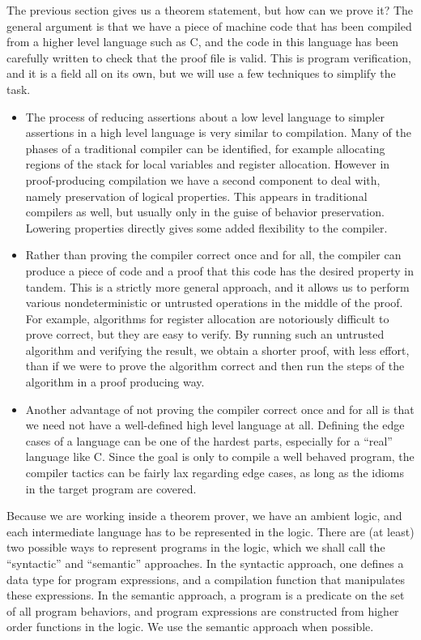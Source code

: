 \documentclass[runningheads]{llncs}
\begin{document}
The previous section gives us a theorem statement, but how can we prove it? The general argument is that we have a piece of machine code that has been compiled from a higher level language such as C, and the code in this language has been carefully written to check that the proof file is valid. This is program verification, and it is a field all on its own, but we will use a few techniques to simplify the task.
\begin{itemize}
  \item The process of reducing assertions about a low level language to simpler assertions in a high level language is very similar to compilation. Many of the phases of a traditional compiler can be identified, for example allocating regions of the stack for local variables and register allocation. However in proof-producing compilation we have a second component to deal with, namely preservation of logical properties. This appears in traditional compilers as well, but usually only in the guise of behavior preservation. Lowering properties directly gives some added flexibility to the compiler.
  \item Rather than proving the compiler correct once and for all, the compiler can produce a piece of code and a proof that this code has the desired property in tandem. This is a strictly more general approach, and it allows us to perform various nondeterministic or untrusted operations in the middle of the proof. For example, algorithms for register allocation are notoriously difficult to prove correct, but they are easy to verify. By running such an untrusted algorithm and verifying the result, we obtain a shorter proof, with less effort, than if we were to prove the algorithm correct and then run the steps of the algorithm in a proof producing way.
  \item Another advantage of not proving the compiler correct once and for all is that we need not have a well-defined high level language at all. Defining the edge cases of a language can be one of the hardest parts, especially for a ``real'' language like C. Since the goal is only to compile a well behaved program, the compiler tactics can be fairly lax regarding edge cases, as long as the idioms in the target program are covered.
\end{itemize}

Because we are working inside a theorem prover, we have an ambient logic, and each intermediate language has to be represented in the logic. There are (at least) two possible ways to represent programs in the logic, which we shall call the ``syntactic'' and ``semantic'' approaches. In the syntactic approach, one defines a data type for program expressions, and a compilation function that manipulates these expressions. In the semantic approach, a program is a predicate on the set of all program behaviors, and program expressions are constructed from higher order functions in the logic. We use the semantic approach when possible.
\end{document}
